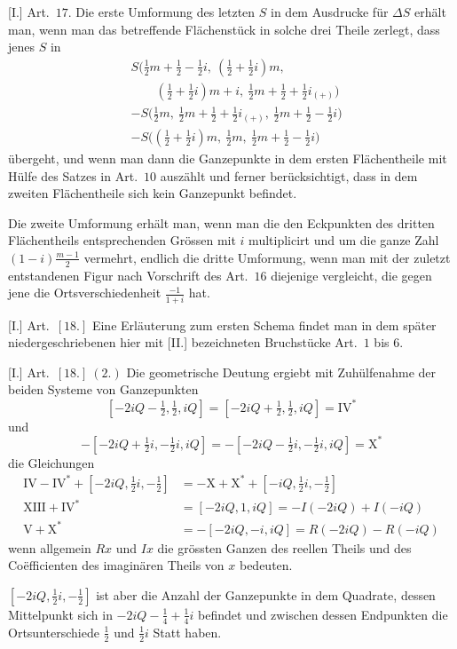%
[I.] Art.\ $17$. Die erste Umformung des letzten $S$ in dem Ausdrucke für $\Delta S$ erhält man, wenn man das betreffende Flächenstück in solche drei Theile zerlegt, dass jenes $S$ in
\[
\begin{aligned}
&S\bigl(\tfrac12m+\tfrac12-\tfrac12i,\ (\tfrac12+\tfrac12i)m,\\
&\qquad(\tfrac12+\tfrac12i)m+i,\ \tfrac12m+\tfrac12+\tfrac12i_{(+)}\bigr)\\
&-S\bigl(\tfrac12m,\ \tfrac12m+\tfrac12+\tfrac12i_{(+)},\ \tfrac12m+\tfrac12-\tfrac12i\bigr)\\
&-S\bigl((\tfrac12+\tfrac12i)m,\ \tfrac12m,\ \tfrac12m+\tfrac12-\tfrac12i\bigr)
\end{aligned}
\]
übergeht, und wenn man dann die Ganzepunkte in dem ersten Flächentheile mit Hülfe des Satzes in Art.\ $10$ auszählt und ferner berücksichtigt, dass in dem zweiten Flächentheile sich kein Ganzepunkt befindet.

Die zweite Umformung erhält man, wenn man die den Eckpunkten des dritten Flächentheils entsprechenden Grössen mit $i$ multiplicirt und um die ganze Zahl $(1-i)\frac{m-1}{2}$ vermehrt, endlich die dritte Umformung, wenn man mit der zuletzt entstandenen Figur nach Vorschrift des Art.\ $16$ diejenige vergleicht, die gegen jene die Ortsverschiedenheit $\frac{-1}{1+i}$ hat.

[I.] Art.\ $[18.]$ Eine Erläuterung zum ersten Schema findet man in dem später niedergeschriebenen hier mit [II.] bezeichneten Bruchstücke Art.\ $1$ bis $6$.

[I.] Art.\ $[18.]\ (2.)$ Die geometrische Deutung ergiebt mit Zuhülfenahme der beiden Systeme von Ganzepunkten
\[
[-2iQ-\tfrac12,\tfrac12,iQ]=[-2iQ+\tfrac12,\tfrac12,iQ]=\mathrm{IV}^{*}
\]
und
\[
-[-2iQ+\tfrac12i,-\tfrac12i,iQ]=-[-2iQ-\tfrac12i,-\tfrac12i,iQ]=\mathrm{X}^{*}
\]
die Gleichungen
\[
\begin{aligned}
\mathrm{IV}-\mathrm{IV}^{*}+[-2iQ,\tfrac12i,-\tfrac12]
&=-\mathrm{X}+\mathrm{X}^{*}+[-iQ,\tfrac12i,-\tfrac12]\\
\mathrm{XIII}+\mathrm{IV}^{*}&=[-2iQ,1,iQ]=-I(-2iQ)+I(-iQ)\\
\mathrm{V}+\mathrm{X}^{*}&=-[-2iQ,-i,iQ]=R(-2iQ)-R(-iQ)
\end{aligned}
\]
wenn allgemein $Rx$ und $Ix$ die grössten Ganzen des reellen Theils und des Coëfficienten des imaginären Theils von $x$ bedeuten.

$[-2iQ,\tfrac12i,-\tfrac12]$ ist aber die Anzahl der Ganzepunkte in dem Quadrate, dessen Mittelpunkt sich in $-2iQ-\tfrac14+\tfrac14i$ befindet und zwischen dessen Endpunkten die Ortsunterschiede $\tfrac12$ und $\tfrac12i$ Statt haben.

